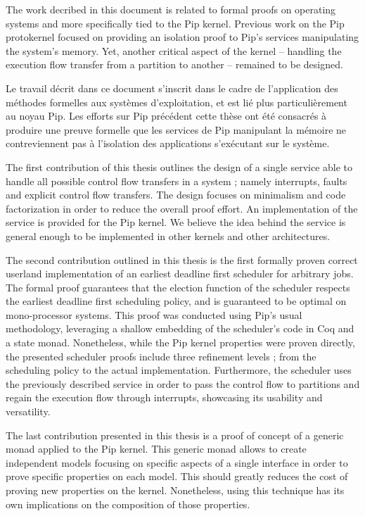 
The work decribed in this document is related to formal proofs on operating systems and more specifically tied to the Pip kernel.
Previous work on the Pip protokernel focused on providing an isolation proof to Pip's services manipulating the system's memory. Yet, another critical aspect of the kernel -- handling the execution flow transfer from a partition to another -- remained to be designed.

Le travail décrit dans ce document s'inscrit dans le cadre de l'application des méthodes formelles aux systèmes d'exploitation, et est lié plus particulièrement au noyau Pip.
Les efforts sur Pip précédent cette thèse ont été consacrés à produire une preuve formelle que les services de Pip manipulant la mémoire ne contreviennent pas à l'isolation des applications s'exécutant sur le système.

The first contribution of this thesis outlines the design of a single service able to handle all possible control flow transfers in a system ; namely interrupts, faults and explicit control flow transfers. The design focuses on minimalism and code factorization in order to reduce the overall proof effort. An implementation of the service is provided for the Pip kernel. We believe the idea behind the service is general enough to be implemented in other kernels and other architectures.

The second contribution outlined in this thesis is the first formally proven correct userland implementation of an earliest deadline first scheduler for arbitrary jobs. The formal proof guarantees that the election function of the scheduler respects the earliest deadline first scheduling policy, and is guaranteed to be optimal on mono-processor systems. This proof was conducted using Pip's usual methodology, leveraging a shallow embedding of the scheduler's code in Coq and a state monad. Nonetheless, while the Pip kernel properties were proven directly, the presented scheduler proofs include three refinement levels ; from the scheduling policy to the actual implementation. Furthermore, the scheduler uses the previously described service in order to pass the control flow to partitions and regain the execution flow through interrupts, showcasing its usability and versatility.

The last contribution presented in this thesis is a proof of concept of a generic monad applied to the Pip kernel. This generic monad allows to create independent models focusing on specific aspects of a single interface in order to prove specific properties on each model. This should greatly reduces the cost of proving new properties on the kernel. Nonetheless, using this technique has its own implications on the composition of those properties.
